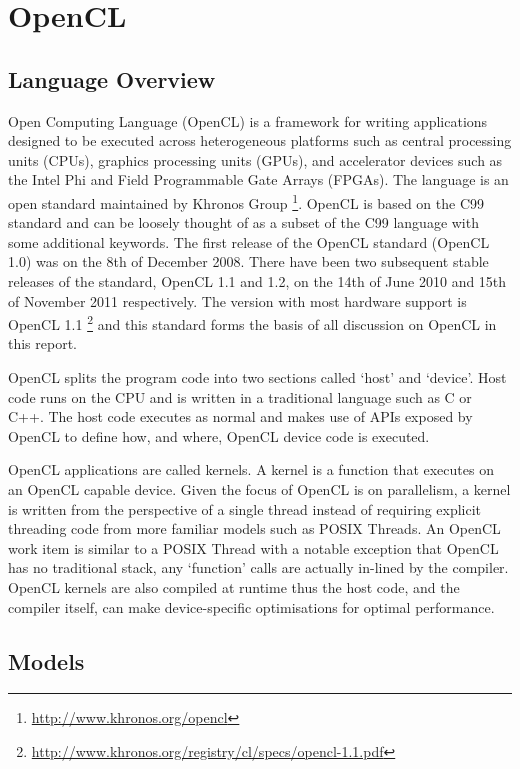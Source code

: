 \section{OpenCL}

\subsection{Language Overview}

Open Computing Language (OpenCL) is a framework for writing applications
designed to be executed across heterogeneous platforms such as central
processing units (CPUs), graphics processing units (GPUs), and accelerator
devices such as the Intel Phi and Field Programmable Gate Arrays (FPGAs). The
language is an open standard maintained by Khronos Group
\footnote{\url{http://www.khronos.org/opencl}}. OpenCL is based on the C99
standard and can be loosely thought of as a subset of the C99 language with some
additional keywords. The first release of the OpenCL standard (OpenCL 1.0) was
on the 8th of December 2008. There have been two subsequent stable releases of
the standard, OpenCL 1.1 and 1.2, on the 14th of June 2010 and 15th of November
2011 respectively. The version with most hardware support is OpenCL 1.1
\footnote{\url{http://www.khronos.org/registry/cl/specs/opencl-1.1.pdf}} and
this standard forms the basis of all discussion on OpenCL in this report.

OpenCL splits the program code into two sections called `host' and `device'.
Host code runs on the CPU and is written in a traditional language such as C or
C++. The host code executes as normal and makes use of APIs exposed by OpenCL to
define how, and where, OpenCL device code is executed.

OpenCL applications are called kernels. A kernel is a function that executes on
an OpenCL capable device. Given the focus of OpenCL is on parallelism, a kernel
is written from the perspective of a single thread instead of requiring explicit
threading code from more familiar models such as POSIX Threads. An OpenCL work
item is similar to a POSIX Thread with a notable exception that OpenCL has no
traditional stack, any `function' calls are actually in-lined by the compiler.
OpenCL kernels are also compiled at runtime thus the host code, and the compiler
itself, can make device-specific optimisations for optimal performance.

\subsection{Models}

